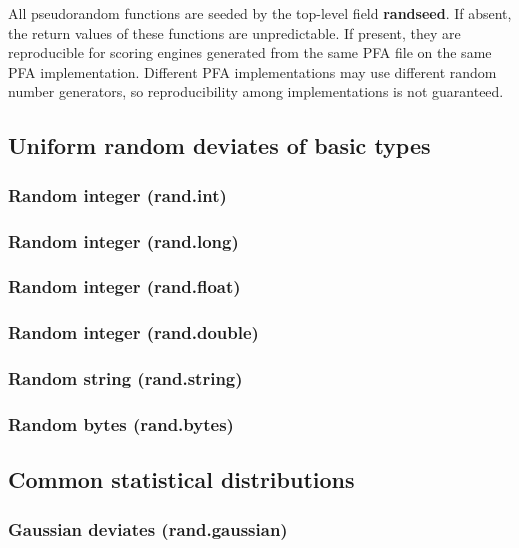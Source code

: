 \documentclass{article}
\newcommand{\PFAc}{\ttfamily\bfseries}
\theoremstyle{definition}
\begin{document}
All pseudorandom functions are seeded by the top-level field {\PFAc randseed}.  If absent, the return values of these functions are unpredictable.  If present, they are reproducible for scoring engines generated from the same PFA file on the same PFA implementation.  Different PFA implementations may use different random number generators, so reproducibility among implementations is not guaranteed.

\subsection{Uniform random deviates of basic types}

\subsubsection{Random integer (rand.int)}

\subsubsection{Random integer (rand.long)}

\subsubsection{Random integer (rand.float)}

\subsubsection{Random integer (rand.double)}

\subsubsection{Random string (rand.string)}

\subsubsection{Random bytes (rand.bytes)}

\subsection{Common statistical distributions}

\subsubsection{Gaussian deviates (rand.gaussian)}
\end{document}
